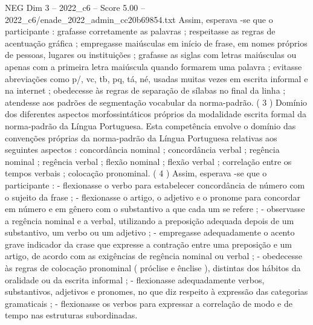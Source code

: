 \begin{textsample}{NEG Dim 3 – 2022\_c6 – Score 5.00 – 2022\_c6/enade\_2022\_admin\_cc20b69854.txt}
Assim, esperava -se que o participante : grafasse corretamente as palavras ; respeitasse as regras de acentuação gráfica ; empregasse maiúsculas em início de frase, em nomes próprios de pessoas, lugares ou instituições ; grafasse as siglas com letras maiúsculas ou apenas com a primeira letra maiúscula quando formarem uma palavra ; evitasse abreviações como p/, vc, tb, pq, tá, né, usadas muitas vezes em escrita informal e na internet ; obedecesse às regras de separação de sílabas no final da linha ; atendesse aos padrões de segmentação vocabular da norma-padrão. ( 3 ) Domínio dos diferentes aspectos morfossintáticos próprios da modalidade escrita formal da norma-padrão da Língua Portuguesa.
Esta competência envolve o domínio das convenções próprias da norma-padrão da Língua Portuguesa relativas aos seguintes aspectos : concordância nominal ; concordância verbal ; regência nominal ; regência verbal ; flexão nominal ; flexão verbal ; correlação entre os tempos verbais ; colocação pronominal. ( 4 ) Assim, esperava -se que o participante : - flexionasse o verbo para estabelecer concordância de número com o sujeito da frase ; - flexionasse o artigo, o adjetivo e o pronome para concordar em número e em gênero com o substantivo a que cada um se refere ; - observasse a regência nominal e a verbal, utilizando a preposição adequada depois de um substantivo, um verbo ou um adjetivo ; - empregasse adequadamente o acento grave indicador da crase que expresse a contração entre uma preposição e um artigo, de acordo com as exigências de regência nominal ou verbal ; - obedecesse às regras de colocação pronominal ( próclise e ênclise ), distintas dos hábitos da oralidade ou da escrita informal ; - flexionasse adequadamente verbos, substantivos, adjetivos e pronomes, no que diz respeito à expressão das categorias gramaticais ; - flexionasse os verbos para expressar a correlação de modo e de tempo nas estruturas subordinadas.

\end{textsample}

